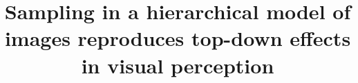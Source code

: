 \documentclass[a4paper]{report}
\begin{document}
\title{Sampling in a hierarchical model of images reproduces top-down effects in visual perception}
\maketitle
\end{document}
